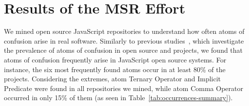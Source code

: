 \section{Results of the MSR Effort}
\label{sec:msr-results} 

We mined \minedprojects open source JavaScript repositories to understand how
often atoms of confusion arise in real software. 
Similarly to previous studies~\cite{DBLP:conf/msr/GopsteinZFC18,DBLP:journals/ese/MedeirosLAAKRG19}, which investigate
the prevalence of atoms of confusion in open source \clang and \cpplang projects, we found that atoms of confusion
frequently arise in JavaScript open source systems. For instance, the six most frequently found atoms
occur in at least 80\% of the projects. Considering the extremes, atom Ternary Operator and Implicit Predicate were found in all repositories we mined,
while atom Comma Operator occurred in only 15\% of them (as seen in Table~\ref{tab:occurrences-summary}).





